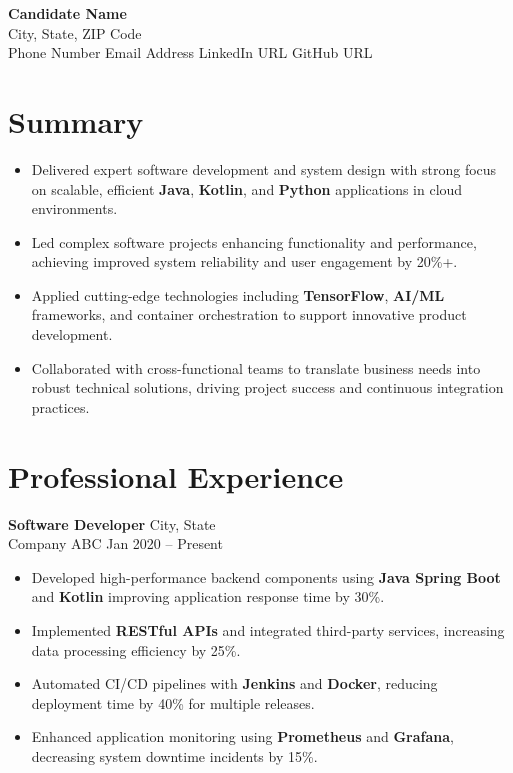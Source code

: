 \documentclass[a4paper]{article}
\begin{document}
\begin{center}
  {\huge \textbf{Candidate Name}}\\
  City, State, ZIP Code \\
  Phone Number \textbullet{} Email Address \textbullet{} LinkedIn URL \textbullet{} GitHub URL
\end{center}

\section*{Summary}
\begin{itemize}[leftmargin=*,label={}]
\item Delivered expert software development and system design with strong focus on scalable, efficient \textbf{Java}, \textbf{Kotlin}, and \textbf{Python} applications in cloud environments.
\item Led complex software projects enhancing functionality and performance, achieving improved system reliability and user engagement by 20\%+.
\item Applied cutting-edge technologies including \textbf{TensorFlow}, \textbf{AI/ML} frameworks, and container orchestration to support innovative product development.
\item Collaborated with cross-functional teams to translate business needs into robust technical solutions, driving project success and continuous integration practices.
\end{itemize}

\section*{Professional Experience}

\textbf{Software Developer} \hfill City, State \\
Company ABC \hfill Jan 2020 -- Present
\begin{itemize}
\item Developed high-performance backend components using \textbf{Java Spring Boot} and \textbf{Kotlin} improving application response time by 30\%.
\item Implemented \textbf{RESTful APIs} and integrated third-party services, increasing data processing efficiency by 25\%.
\item Automated CI/CD pipelines with \textbf{Jenkins} and \textbf{Docker}, reducing deployment time by 40\% for multiple releases.
\item Enhanced application monitoring using \textbf{Prometheus} and \textbf{Grafana}, decreasing system downtime incidents by 15\%.
\end{itemize}
\end{document}
